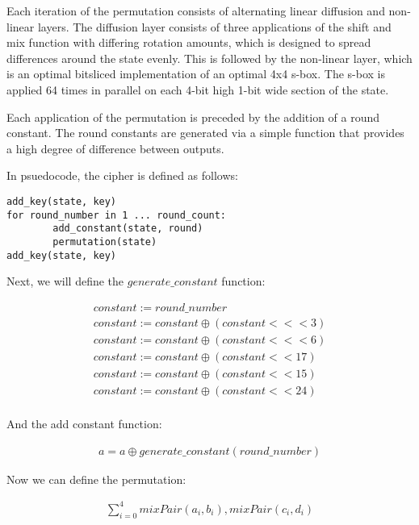 \documentclass[preprint]{iacrtrans}
\begin{document}
Each iteration of the permutation consists of alternating linear diffusion and non-linear layers. The diffusion layer consists of three applications of the shift and mix function with differing rotation amounts, which is designed to spread differences around the state evenly. This is followed by the non-linear layer, which is an optimal bitsliced implementation of an optimal 4x4 s-box. The s-box is applied 64 times in parallel on each 4-bit high 1-bit wide section of the state.

Each application of the permutation is preceded by the addition of a round constant. The round constants are generated via a simple function that provides a high degree of difference between outputs.

In psuedocode, the cipher is defined as follows:

\begin{verbatim}
add_key(state, key)
for round_number in 1 ... round_count:
        add_constant(state, round)
        permutation(state)
add_key(state, key)
\end{verbatim}

Next, we will define the $generate\_constant$ function:

\begin{align}
constant := round\_number\\
constant := constant \oplus (constant <<< 3)\\
constant := constant \oplus (constant <<< 6)\\
constant := constant \oplus (constant << 17)\\
constant := constant \oplus (constant << 15)\\
constant := constant \oplus (constant << 24)\\
\end{align}

And the add constant function:

\begin{align}
a = a \oplus generate\_constant(round\_number)
\end{align}

Now we can define the permutation:




\begin{align}
\displaystyle\sum_{i=0}^{4} mixPair(a_i, b_i), mixPair(c_i, d_i)\\
\end{align}
\end{document}

